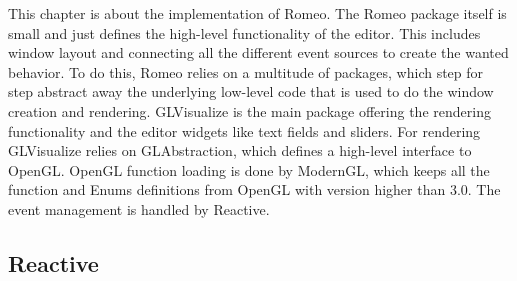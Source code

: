 This chapter is about the implementation of Romeo.
The Romeo package itself is small and just defines the high-level functionality of the editor.
This includes window layout and connecting all the different event sources to create the wanted behavior.
To do this, Romeo relies on a multitude of packages, which step for step abstract away the underlying low-level code that is used to do the window creation and rendering.
GLVisualize is the main package offering the rendering functionality and the editor widgets like text fields and sliders.
For rendering GLVisualize relies on GLAbstraction, which defines a high-level interface to OpenGL.
OpenGL function loading is done by ModernGL, which keeps all the function and Enums definitions from OpenGL with version higher than 3.0.
The event management is handled by Reactive.

\subsection{Reactive}

